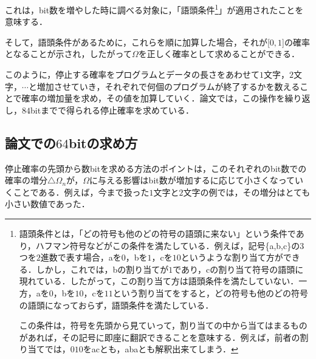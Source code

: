 \documentclass{jarticle}
\begin{document}
これは，bit数を増やした時に調べる対象に，「語頭条件\footnote{


語頭条件とは，「どの符号も他のどの符号の語頭に来ない」という条件であり，ハフマン符号などがこの条件を満たしている．例えば，記号\{a,b,c\}の$3$つを$2$進数で表す場合，aを$0$，bを$1$，cを$10$というような割り当て方ができる．しかし，これでは，bの割り当てが$1$であり，cの割り当て符号の語頭に現れている．したがって，この割り当て方は語頭条件を満たしていない．一方，aを$0$，bを$10$，cを$11$という割り当てをすると，どの符号も他のどの符号の語頭になっておらず，語頭条件を満たしている．

この条件は，符号を先頭から見ていって，割り当ての中から当てはまるものがあれば，その記号に即座に翻訳できることを意味する．例えば，前者の割り当てでは，$010$をacとも，abaとも解釈出来てしまう．

}」が適用されたことを意味する．

そして，語頭条件があるために，これらを順に加算した場合，それが[$0,1$]の確率となることが示され，したがって$\Omega$を正しく確率として求めることができる．


このように，停止する確率をプログラムとデータの長さをあわせて$1$文字，$2$文字，$\cdots$と増加させていき，それぞれで何個のプログラムが終了するかを数えることで確率の増加量を求め，その値を加算していく．論文では，この操作を繰り返し，$84$bitまでで得られる停止確率を求めている．


\subsection{論文での$64$bitの求め方}

停止確率の先頭から数bitを求める方法のポイントは，このそれぞれのbit数での確率の増分$\triangle \Omega_n$が，$\Omega$に与える影響はbit数が増加するに応じて小さくなっていくことである．例えば，今まで扱った$1$文字と$2$文字の例では，その増分はとても小さい数値であった．
\end{document}
